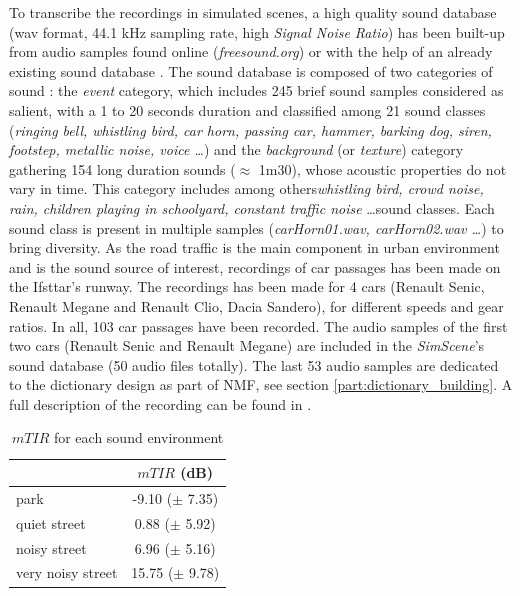 \documentclass[review,5p,twocolumn,sort&compress,times]{elsarticle}
\begin{document}
To transcribe the recordings in simulated scenes, a high quality sound database (wav format, 44.1 kHz sampling rate, high \textit{Signal Noise Ratio}) has been built-up from audio samples found online (\textit{freesound.org}) or with the help of an already existing sound database \cite{salamon2014dataset}. The sound database is composed of two categories of sound : the \textit{event} category, which includes 245 brief sound samples considered as salient, with a 1 to 20 seconds duration and classified among 21 sound classes (\textit{ringing bell, whistling bird, car horn, passing car, hammer, barking dog, siren, footstep, metallic noise, voice \dots}) and the \textit{background} (or \textit{texture}) category gathering 154 long duration sounds ($\approx$ 1m30), whose acoustic properties do not vary in time. This category includes among others\textit{whistling bird, crowd noise, rain, children playing in schoolyard, constant traffic noise} \dots sound classes. Each sound class is present in multiple samples (\textit{carHorn01.wav, carHorn02.wav \dots}) to bring diversity.
As the road traffic is the main component in urban environment and is the sound source of interest, recordings of car passages has been made on the Ifsttar's runway. The recordings has been made for 4 cars (Renault Senic, Renault Megane and Renault Clio, Dacia Sandero),  for different speeds and gear ratios. In all, 103 car passages have been recorded. The audio samples of the first two cars (Renault Senic and Renault Megane) are included in the \textit{SimScene}'s sound database (50 audio files totally). The last 53 audio samples are dedicated to the dictionary design as part of NMF, see section \ref{part:dictionary_building}. A full description of the recording can be found in \cite{gloaguen_creation_2017}.

\begin{table}[t]
\centering
\caption{$mTIR$ for each sound environment}
\begin{tabular}{lc}
 & $mTIR$ (dB)\\ \hline
 park & -9.10 ($\pm$ 7.35) \\
 quiet street & 0.88 ($\pm$ 5.92) \\
 noisy street & 6.96 ($\pm$ 5.16) \\
 very noisy street & 15.75 ($\pm$ 9.78) \\ \hline
\end{tabular}
\label{tab:mTIR}
\end{table}
\end{document}

